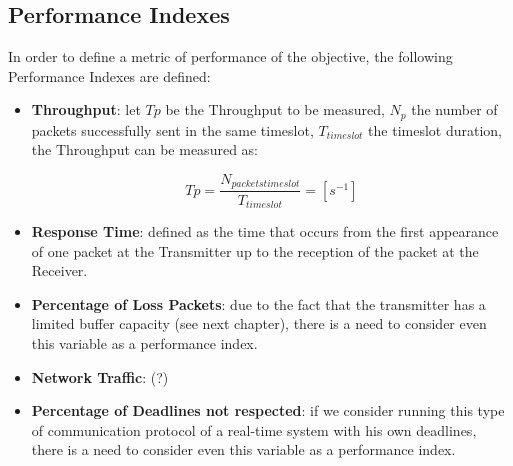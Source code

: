 \subsection{Performance Indexes}
In order to define a metric of performance of the objective, the following Performance Indexes are defined:
\begin{itemize}
	\item \textbf{Throughput}: let $Tp$ be the Throughput to be measured, $N_{p}$ the number of packets successfully sent in the same timeslot, $T_{timeslot}$ the timeslot duration, the Throughput can be measured as:
	
	\begin{equation}
	Tp = \frac{N_{packets  timeslot}}{T_{timeslot}} = [s^{-1}]
	\end{equation}
	
	\item \textbf{Response Time}: defined as the time that occurs from the first appearance of one packet at the Transmitter up to the reception of the packet at the Receiver.
	\item \textbf{Percentage of Loss Packets}: due to the fact that the transmitter has a limited buffer capacity (see next chapter), there is a need to consider even this variable as a performance index.
	\item \textbf{Network Traffic}: (?)
	\item \textbf{Percentage of Deadlines not respected}: if we consider running this type of communication protocol of a real-time system with his own deadlines, there is a need to consider even this variable as a performance index.
\end{itemize}
